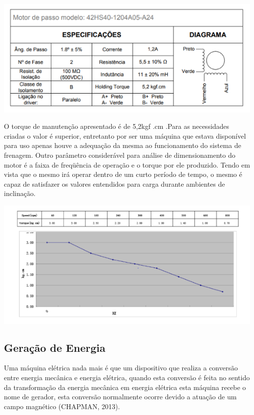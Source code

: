                             
 \begin{center}
    	\includegraphics[scale=0.7]{figuras/tec}
        \label{tec}
    \end{center}
O torque de manutenção apresentado é de 5,2kgf .cm .Para as necessidades criadas o valor é superior, entretanto por ser uma máquina que estava disponível para uso apenas houve a adequação da mesma ao funcionamento do sistema de frenagem. 
Outro parâmetro considerável para análise de dimensionamento do motor é a faixa de freqüência de operação e o torque por ele produzido. Tendo em vista que o mesmo irá operar dentro de um curto período de tempo, o mesmo é capaz de satisfazer os valores entendidos para carga durante ambientes de inclinação.
                                    

 \begin{center}
    	\includegraphics[scale=0.7]{figuras/torque}
        \label{toque}
    \end{center}
  \subsection{Geração de Energia }  

Uma máquina elétrica nada mais é que um dispositivo que realiza a conversão entre energia mecânica e energia elétrica, quando esta conversão é feita no sentido da transformação da energia mecânica em energia elétrica esta máquina recebe o nome de gerador, esta conversão normalmente ocorre devido a atuação de um campo magnético (CHAPMAN, 2013). 

